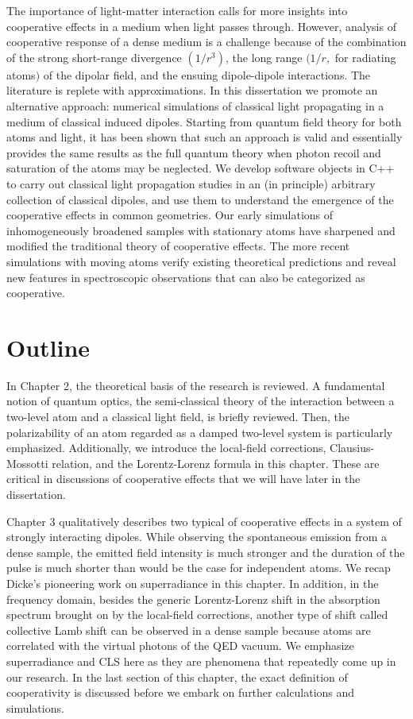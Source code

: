 The importance of light-matter interaction calls for more insights into cooperative effects in a medium when light passes through. However, analysis of cooperative response of a dense medium is a challenge because of the combination of the strong short-range divergence $(1/r^3)$, the long range $(1/r, $ for radiating atoms$)$ of the dipolar field, and the ensuing dipole-dipole interactions. The literature is replete with approximations\cite{FRIEDBERG1973101}. In this dissertation we promote an alternative approach: numerical simulations of classical light propagating in a medium of classical induced dipoles. Starting from quantum field theory for both atoms and light, it has been shown\cite{PhysRevA.55.513} that such an approach is valid and essentially provides the same results as the full quantum theory when photon recoil and saturation of the atoms may be neglected. We develop software objects in C++ to carry out classical light propagation studies in an (in principle) arbitrary collection of classical dipoles, and use them to understand the emergence of the cooperative effects in common geometries. Our early simulations of inhomogeneously broadened samples with stationary atoms have sharpened and modified the traditional theory of cooperative effects. The more recent simulations with moving atoms verify existing theoretical predictions and reveal new features in spectroscopic observations that can also be categorized as cooperative.


\section{Outline}

In Chapter 2, the theoretical basis of the research is reviewed. A fundamental notion of quantum optics, the semi-classical theory of the interaction between a two-level atom and a classical light field, is briefly reviewed. Then, the polarizability of an atom regarded as a damped two-level system is particularly emphasized. Additionally, we introduce the local-field corrections,  Clausius-Mossotti relation, and the Lorentz-Lorenz formula in this chapter. These are critical in discussions of cooperative effects that we will have later in the dissertation.

Chapter 3 qualitatively describes two typical of cooperative effects in a system of strongly interacting dipoles. While observing the spontaneous emission from a dense sample, the emitted field intensity is much stronger and the duration of the pulse is much shorter than would be the case for  independent atoms. We recap Dicke's pioneering work on superradiance in this chapter. In addition, in the frequency domain, besides the generic Lorentz-Lorenz shift  in the absorption spectrum brought on by the local-field corrections, another type of shift called collective Lamb shift can be observed in a dense sample because atoms are correlated with the virtual photons of the QED vacuum. We emphasize superradiance and CLS here as they are phenomena that repeatedly come up in our research. In the last section of this chapter, the exact definition of cooperativity is discussed before we embark on further calculations and simulations.

